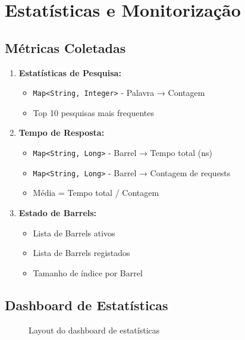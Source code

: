 \documentclass[12pt,a4paper]{article}
\begin{document}
\newpage

\section{Estatísticas e Monitorização}

\subsection{Métricas Coletadas}

\begin{enumerate}
    \item \textbf{Estatísticas de Pesquisa:}
    \begin{itemize}
        \item \texttt{Map<String, Integer>} - Palavra → Contagem
        \item Top 10 pesquisas mais frequentes
    \end{itemize}
    
    \item \textbf{Tempo de Resposta:}
    \begin{itemize}
        \item \texttt{Map<String, Long>} - Barrel → Tempo total (ns)
        \item \texttt{Map<String, Long>} - Barrel → Contagem de requests
        \item Média = Tempo total / Contagem
    \end{itemize}
    
    \item \textbf{Estado de Barrels:}
    \begin{itemize}
        \item Lista de Barrels ativos
        \item Lista de Barrels registados
        \item Tamanho de índice por Barrel
    \end{itemize}
\end{enumerate}

\subsection{Dashboard de Estatísticas}

\begin{figure}[H]
\centering
{}
\caption{Layout do dashboard de estatísticas}
\end{figure}
\end{document}
